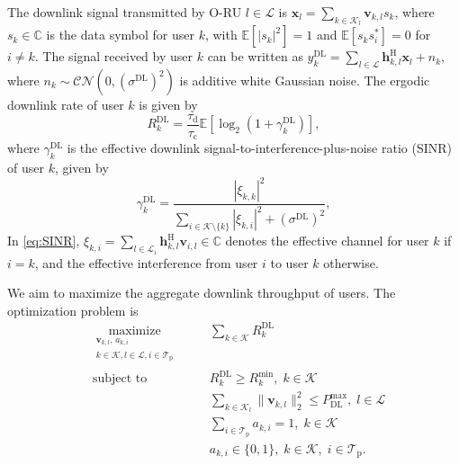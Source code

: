 \documentclass[10pt, conference]{IEEEtran}
\DeclareMathOperator*{\maximize}{maximize}
\begin{document}
The downlink signal transmitted by O-RU $l\in\mathcal{L}$ is $\mathbf{x}_l=\sum_{k\in\mathcal{K}_l}\mathbf{v}_{k,l}s_k$,
where $s_k\in\mathbb{C}$ is the data symbol for user $k$, with $\mathbb{E}[|s_k|^2]=1$ and $\mathbb{E}[s_k s_i^*]=0$ for $i\neq k$. The signal received by user $k$ can be written as $    y_k^\textrm{DL} = \sum_{l\in\mathcal{L}} \mathbf{h}_{k,l}^\mathrm{H}\mathbf{x}_l + n_k$,
where $n_k\sim\mathcal{CN}\left(0,\left(\sigma^{\mathrm{DL}}\right)^2\right)$ is additive white Gaussian noise.
The ergodic downlink rate of user $k$ is given by
\begin{equation}\label{eq:rate_uatf_start}
    R_k^{\textrm{DL}}
    =
    \frac{\tau_{\textrm{d}}}{\tau_{\textrm{c}}} \mathbb{E}\left[\log_2\left(1+\gamma_k^\textrm{DL}\right)\right],
\end{equation}
where $\gamma_k^\textrm{DL}$ is the effective downlink signal-to-interference-plus-noise ratio (SINR) of user $k$, given by
\begin{equation}\label{eq:SINR}
    \gamma_k^\textrm{DL}
    =
    \frac{\left|\xi_{k,k}\right|^2}
    {\sum_{i\in\mathcal{K} \setminus\{k\}}\left|\xi_{k,i}\right|^2
    +\left(\sigma^{\mathrm{DL}}\right)^2 },
\end{equation}
In \eqref{eq:SINR}, $\xi_{k,i} = \sum_{l\in \mathcal{L}_i}\mathbf{h}_{k,l}^\mathrm{H}\mathbf{v}_{i,l} \in \mathbb{C}$ denotes the effective channel for user $k$ if $i=k$, and the effective interference from user $i$ to user $k$ otherwise.

We aim to maximize the aggregate downlink throughput of users. The optimization problem is
\begin{subequations} \label{eq:optimization}
\begin{alignat}{2}
&\maximize\limits_{\substack{
\mathbf{v}_{k,l},\,a_{k,i}\\
k\in\mathcal{K},l\in\mathcal{L},i\in\mathcal{T}_{\mathrm{p}}
}}
& &\quad \sum_{k\in\mathcal{K}} R_k^{\mathrm{DL}} \label{eq:obj}\\
&\textrm{subject to}
& &\quad R_k^{\mathrm{DL}} \ge R_k^{\min},\; k\in\mathcal{K} \label{eq:cons_rate_min}\\
& & &\quad \sum_{k\in\mathcal{K}_l}\|\mathbf{v}_{k,l}\|_2^2 \le P_\textrm{DL}^{\textrm{max}},\; l\in\mathcal{L} \label{eq:cons_dl_power}\\
& & &\quad \sum_{i\in\mathcal{T}_{\mathrm{p}}} a_{k,i} = 1,\; k\in\mathcal{K} \label{eq:cons_one_pilot}\\
& & &\quad a_{k,i}\in\{0,1\},\; k\in\mathcal{K},\; i\in\mathcal{T}_{\mathrm{p}}. \label{eq:cons_binary_a}
\end{alignat}
\end{subequations}
\end{document}
